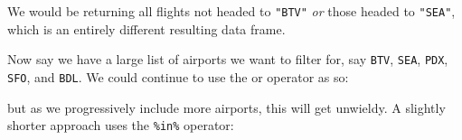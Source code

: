 \documentclass[12pt, krantz2,]{krantz}
\makeatletter
\newenvironment{Shaded}{\begin{snugshade}}{\end{snugshade}}
\newcommand{\KeywordTok}[1]{\textcolor[rgb]{0.27,0.27,0.27}{\textbf{#1}}}
\newcommand{\NormalTok}[1]{#1}
\newcommand{\OperatorTok}[1]{\textcolor[rgb]{0.43,0.43,0.43}{\textbf{#1}}}
\newcommand{\StringTok}[1]{\textcolor[rgb]{0.5,0.5,0.5}{#1}}
\newenvironment{kframe}{%
\medskip{}
\setlength{\fboxsep}{.8em}
 \def\at@end@of@kframe{}%
 \ifinner\ifhmode%
  \def\at@end@of@kframe{\end{minipage}}%
  \begin{minipage}{\columnwidth}%
 \fi\fi%
 \def\FrameCommand##1{\hskip\@totalleftmargin \hskip-\fboxsep
 \colorbox{shadecolor}{##1}\hskip-\fboxsep
     \hskip-\linewidth \hskip-\@totalleftmargin \hskip\columnwidth}%
 \MakeFramed {\advance\hsize-\width
   \@totalleftmargin\z@ \linewidth\hsize
   \@setminipage}}%
 {\par\unskip\endMakeFramed%
 \at@end@of@kframe}
\renewenvironment{Shaded}{\begin{kframe}}{\end{kframe}}
\makeatother
\begin{document}
\begin{Shaded}
\end{Shaded}

We would be returning all flights not headed to \texttt{"BTV"} \emph{or} those headed to \texttt{"SEA"}, which is an entirely different resulting data frame.

Now say we have a large list of airports we want to filter for, say \texttt{BTV}, \texttt{SEA}, \texttt{PDX}, \texttt{SFO}, and \texttt{BDL}. We could continue to use the \texttt{\textbar{}} or operator as so:

\begin{Shaded}
\end{Shaded}

but as we progressively include more airports, this will get unwieldy. A slightly shorter approach uses the \texttt{\%in\%} operator:

\begin{Shaded}
\end{Shaded}
\end{document}
